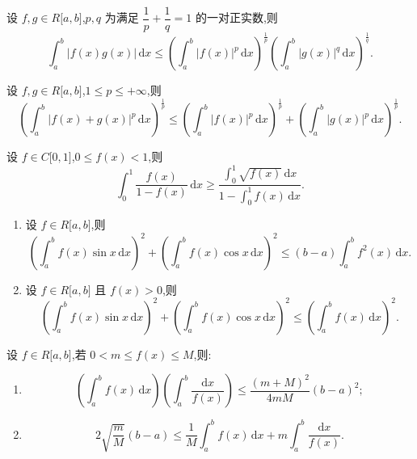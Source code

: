 \documentclass[../数学分析培优讲义.tex]{subfiles}
\begin{document}
\begin{theorem}
设 $f,g\in R\lbrack a,b\rbrack$,$p,q$ 为满足 $\dfrac{1}{p}+\dfrac{1}{q}=1$ 的一对正实数,则
\[
    \int_a^b|f(x)g(x)|\,\mathrm{d}x
    \leq
    \left(\int_a^b|f(x)|^p\,\mathrm{d}x\right)^{\frac{1}{p}}
    \left(\int_a^b|g(x)|^q\,\mathrm{d}x\right)^{\frac{1}{q}}.
\]
\end{theorem}

\begin{theorem}
设 $f,g\in R\lbrack a,b\rbrack$,$1\leq p\leq+\infty$,则
\[
    \left(\int_a^b|f(x)+g(x)|^p\,\mathrm{d}x\right)^{\frac{1}{p}}
    \leq
    \left(\int_a^b|f(x)|^p\,\mathrm{d}x\right)^{\frac{1}{p}}
    +\left(\int_a^b|g(x)|^p\,\mathrm{d}x\right)^{\frac{1}{p}}.
\]
\end{theorem}

\begin{example}
设 $f\in C\lbrack 0,1\rbrack$,$0\leq f(x)<1$,则
\[
    \int_0^1\dfrac{f(x)}{1-f(x)}\,\mathrm{d}x
    \geq
    \dfrac{\displaystyle\int_0^1\sqrt{f(x)}\,\mathrm{d}x}
    {1-\displaystyle\int_0^1f(x)\,\mathrm{d}x}.
\]
\end{example}
\exampleblank

\begin{example}
\begin{enumerate}[label=(\arabic*)]
    \item 设 $f\in R\lbrack a,b\rbrack$,则
    \[
        \left(\int_a^bf(x)\sin x\,\mathrm{d}x\right)^2
        +\left(\int_a^bf(x)\cos x\,\mathrm{d}x\right)^2
        \leq(b-a)\int_a^bf^2(x)\,\mathrm{d}x.
    \]
    \item 设 $f\in R\lbrack a,b\rbrack$ 且 $f(x)>0$,则
    \[
        \left(\int_a^bf(x)\sin x\,\mathrm{d}x\right)^2
        +\left(\int_a^bf(x)\cos x\,\mathrm{d}x\right)^2
        \leq\left(\int_a^bf(x)\,\mathrm{d}x\right)^2.
    \]
\end{enumerate}
\end{example}
\exampleblank

\begin{example}
设 $f\in R\lbrack a,b\rbrack$,若 $0<m\leq f(x)\leq M$,则:
\begin{enumerate}[label=(\arabic*)]
    \item
    \[
        \left(\int_a^bf(x)\,\mathrm{d}x\right)
        \left(\int_a^b\dfrac{\mathrm{d}x}{f(x)}\right)
        \leq\dfrac{(m+M)^2}{4mM}(b-a)^2;
    \]
    \item
    \[
        2\sqrt{\dfrac{m}{M}}(b-a)
        \leq\dfrac{1}{M}\int_a^bf(x)\,\mathrm{d}x
        +m\int_a^b\dfrac{\mathrm{d}x}{f(x)}.
    \]
\end{enumerate}
\end{example}
\exampleblank
\end{document}
